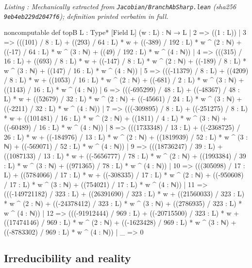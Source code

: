 \documentclass[a4paper,11pt]{article}
\newcounter{leanlisting}
\newenvironment{leanlisting}[2]{%
  \refstepcounter{leanlisting}\label{#2}%
  \begin{center}\textit{\small Listing \theleanlisting: #1}\end{center}%
  \Verbatim[breaklines=true,breakanywhere=true,fontsize=\footnotesize,frame=single,framesep=4pt,rulecolor=\color{gray!50},fillcolor=\color{gray!5}]%
}{%
  \endVerbatim%
}
\theoremstyle{plain}
\theoremstyle{definition}
\theoremstyle{remark}
\begin{document}
\begin{leanlisting}{Mechanically extracted from \texttt{Jacobian/BranchAbSharp.lean} (sha256 \texttt{9eb4eb229d2047f6}); definition printed verbatim in full.}{lst:def-topb}
noncomputable def topB {L : Type*} [Field L] (w : L) : ℕ → L
  | 2 => ((1 : L))
  | 3 => (((101) / 8 : L) + ((293) / 64 : L) * w + ((-389) / 192 : L) * w ^ (2 : ℕ) + ((-17) / 64 : L) * w ^ (3 : ℕ) + ((49) / 192 : L) * w ^ (4 : ℕ))
  | 4 => (((315) / 16 : L) + ((693) / 8 : L) * w + ((-147) / 8 : L) * w ^ (2 : ℕ) + ((-189) / 8 : L) * w ^ (3 : ℕ) + ((147) / 16 : L) * w ^ (4 : ℕ))
  | 5 => (((-11379) / 8 : L) + ((4209) / 8 : L) * w + ((1053) / 16 : L) * w ^ (2 : ℕ) + ((-681) / 2 : L) * w ^ (3 : ℕ) + ((1143) / 16 : L) * w ^ (4 : ℕ))
  | 6 => (((-695299) / 48 : L) + ((-48367) / 48 : L) * w + ((52679) / 32 : L) * w ^ (2 : ℕ) + ((-45661) / 24 : L) * w ^ (3 : ℕ) + ((-2211) / 32 : L) * w ^ (4 : ℕ))
  | 7 => (((-309895) / 8 : L) + ((-251275) / 8 : L) * w + ((101481) / 16 : L) * w ^ (2 : ℕ) + ((1811) / 4 : L) * w ^ (3 : ℕ) + ((-60489) / 16 : L) * w ^ (4 : ℕ))
  | 8 => (((1733348) / 13 : L) + ((-2368725) / 26 : L) * w + ((-184976) / 13 : L) * w ^ (2 : ℕ) + ((1819939) / 52 : L) * w ^ (3 : ℕ) + ((-569071) / 52 : L) * w ^ (4 : ℕ))
  | 9 => (((18736247) / 39 : L) + ((1087133) / 13 : L) * w + ((-5656777) / 78 : L) * w ^ (2 : ℕ) + ((1993384) / 39 : L) * w ^ (3 : ℕ) + ((971365) / 78 : L) * w ^ (4 : ℕ))
  | 10 => (((305098) / 17 : L) + ((5784066) / 17 : L) * w + ((-308335) / 17 : L) * w ^ (2 : ℕ) + ((-950608) / 17 : L) * w ^ (3 : ℕ) + ((754021) / 17 : L) * w ^ (4 : ℕ))
  | 11 => (((-149721182) / 323 : L) + ((26391690) / 323 : L) * w + ((21560033) / 323 : L) * w ^ (2 : ℕ) + ((-24378412) / 323 : L) * w ^ (3 : ℕ) + ((2786935) / 323 : L) * w ^ (4 : ℕ))
  | 12 => (((-91912444) / 969 : L) + ((-20715500) / 323 : L) * w + ((17474146) / 969 : L) * w ^ (2 : ℕ) + ((-1623428) / 969 : L) * w ^ (3 : ℕ) + ((-8783302) / 969 : L) * w ^ (4 : ℕ))
  | _ => 0
\end{leanlisting}

\subsection{Irreducibility and reality}
\end{document}
